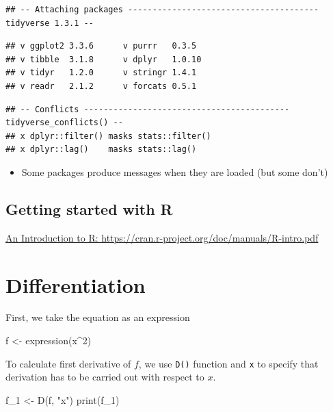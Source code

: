 \documentclass[
]{book}
\newenvironment{Shaded}{\begin{snugshade}}{\end{snugshade}}
\newcommand{\DecValTok}[1]{\textcolor[rgb]{0.00,0.00,0.81}{#1}}
\newcommand{\FunctionTok}[1]{\textcolor[rgb]{0.00,0.00,0.00}{#1}}
\newcommand{\NormalTok}[1]{#1}
\newcommand{\OtherTok}[1]{\textcolor[rgb]{0.56,0.35,0.01}{#1}}
\newcommand{\SpecialCharTok}[1]{\textcolor[rgb]{0.00,0.00,0.00}{#1}}
\newcommand{\StringTok}[1]{\textcolor[rgb]{0.31,0.60,0.02}{#1}}
\providecommand{\tightlist}{%
  \setlength{\itemsep}{0pt}\setlength{\parskip}{0pt}}
\begin{document}
\begin{verbatim}
## -- Attaching packages --------------------------------------- tidyverse 1.3.1 --
\end{verbatim}

\begin{verbatim}
## v ggplot2 3.3.6      v purrr   0.3.5 
## v tibble  3.1.8      v dplyr   1.0.10
## v tidyr   1.2.0      v stringr 1.4.1 
## v readr   2.1.2      v forcats 0.5.1
\end{verbatim}

\begin{verbatim}
## -- Conflicts ------------------------------------------ tidyverse_conflicts() --
## x dplyr::filter() masks stats::filter()
## x dplyr::lag()    masks stats::lag()
\end{verbatim}

\begin{itemize}
\tightlist
\item
  Some packages produce messages when they are loaded (but some don't)
\end{itemize}

\hypertarget{getting-started-with-r}{%
\section{Getting started with R}\label{getting-started-with-r}}

\href{https://cran.r-project.org/doc/manuals/R-intro.pdf}{An Introduction to R: https://cran.r-project.org/doc/manuals/R-intro.pdf}

\hypertarget{differentiation}{%
\chapter{Differentiation}\label{differentiation}}

First, we take the equation as an expression

\begin{Shaded}
\begin{Highlighting}[]
\NormalTok{f }\OtherTok{\textless{}{-}} \FunctionTok{expression}\NormalTok{(x}\SpecialCharTok{\^{}}\DecValTok{2}\NormalTok{)}
\end{Highlighting}
\end{Shaded}

To calculate first derivative of \(f\), we use \texttt{D()} function and \texttt{x} to specify that derivation has to be carried out with respect to
\(x\).

\begin{Shaded}
\begin{Highlighting}[]
\NormalTok{f\_1 }\OtherTok{\textless{}{-}} \FunctionTok{D}\NormalTok{(f, }\StringTok{"x"}\NormalTok{)}
\FunctionTok{print}\NormalTok{(f\_1)}
\end{Highlighting}
\end{Shaded}
\end{document}
